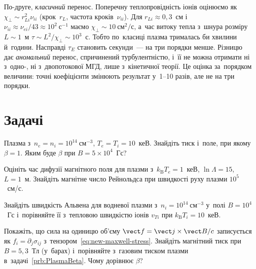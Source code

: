 По-друге, \emph{класичний} перенос. Поперечну теплопровідність іонів оцінюємо як
$\chi_\perp\sim r_{Li}^2\nu_{ii}$ (крок~$r_L$, частота кроків~$\nu_{ii}$). Для
$r_{Li}\approx0{,}3$~см і~$\nu_{ii}\approx\nu_{ei}/43\approx10^{2}~\mathrm{с}^{-1}$ маємо
$\chi_\perp\sim10~\mathrm{см}^2/\mathrm{с}$, а~час витоку тепла з~шнура розміру $L\sim1$~м
$\tau\sim L^2/\chi_\perp\sim10^{3}$~с. Тобто по~класиці плазма трималась би хвилини
й~години. Насправді $\tau_E$ становить секунди~--- на три порядки менше. Різницю дає
\emph{аномальний} перенос, спричинений турбулентністю, і~її не можна отримати ні з~одно-,
ні з~двопотокової МГД, лише з~кінетичної теорії. Це оцінка за~порядком величини: точні
коефіцієнти змінюють результат у~1--10 разів, але не на три порядки.






\section*{Задачі}

\begin{problem}\label{prb:PlasmaBeta}
	Плазма з~$n_e=n_i=10^{14}~\mathrm{см}^{-3}$, $T_e=T_i=10$~кеВ. Знайдіть тиск і~поле,
	при якому $\beta=1$. Яким буде $\beta$ при $B=5\times10^4$~Гс?
\end{problem}

\begin{problem}\label{prb:PlasmaDiffusion}
	Оцініть час дифузії магнітного поля для плазми з~$k_{\mathrm B}T_e=1$~кеВ,
	$\ln\Lambda=15$, $L=1$~м. Знайдіть магнітне число Рейнольдса при швидкості руху плазми
	$10^5$~см/с.
\end{problem}

\begin{problem}\label{prb:PlasmaAlfven}
	Знайдіть швидкість Альвена для водневої плазми з~$n_i=10^{14}~\mathrm{см}^{-3}$ у~полі
	$B=10^4$~Гс і~порівняйте її з~тепловою швидкістю іонів $v_{Ti}$ при $k_{\mathrm
	B}T_i=10$~кеВ.
\end{problem}

\begin{problem}\label{prb:new-stress}
	Покажіть, що сила на одиницю об'єму $\vect f=\vect j\times\vect B/c$ записується як
	$f_i=\partial_j\sigma_{ij}$ з~тензором~\eqref{eq:new-maxwell-stress}. Знайдіть
	магнітний тиск при $B=5{,}3$~Тл (у~барах) і~порівняйте з~газовим тиском плазми
	в~задачі~\ref{prb:PlasmaBeta}. Чому дорівнює $\beta$?
\end{problem}

